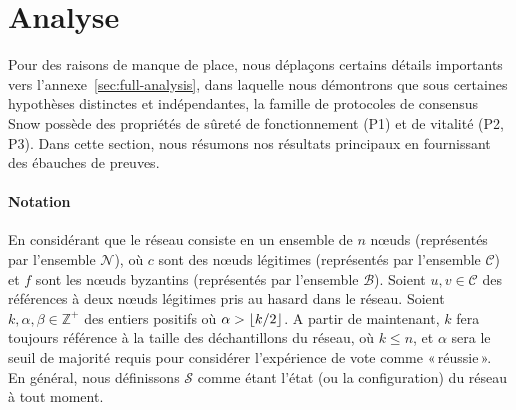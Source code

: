 \documentclass[a4,twocolumn,10pt]{article}
\DeclarePairedDelimiter{\floor}{\lfloor}{\rfloor}
\theoremstyle{definition}
\begin{document}


\section{Analyse}
\label{sec:analysis}
Pour des raisons de manque de place, nous déplaçons certains détails importants vers l'annexe~\ref{sec:full-analysis},
dans laquelle nous démontrons que sous certaines hypothèses distinctes et indépendantes, la famille de protocoles de
consensus Snow possède des propriétés de sûreté de fonctionnement (P1) et de vitalité (P2, P3). Dans cette section,
nous résumons nos résultats principaux en fournissant des ébauches de preuves.


\paragraph{Notation} En considérant que le réseau consiste en un ensemble de $n$ nœuds (représentés par l'ensemble
$\mathcal{N}$), où $c$ sont des nœuds légitimes (représentés par l'ensemble $\mathcal{C}$) et $f$ sont les nœuds
byzantins (représentés par l'ensemble $\mathcal{B}$). Soient $u, v \in \mathcal{C}$ des références à deux nœuds
légitimes pris au hasard dans le réseau. Soient $k, \alpha, \beta \in \mathbb{Z}^+$ des entiers positifs où
$\alpha > \floor{k/2}$. A partir de maintenant, $k$ fera toujours référence à la taille des déchantillons du réseau,
où $k \leq n$, et $\alpha$ sera le seuil de majorité requis pour considérer l'expérience de vote comme «\,réussie\,».
En général, nous définissons $\mathcal{S}$ comme étant l'état (ou la configuration) du réseau à tout moment.
\end{document}
